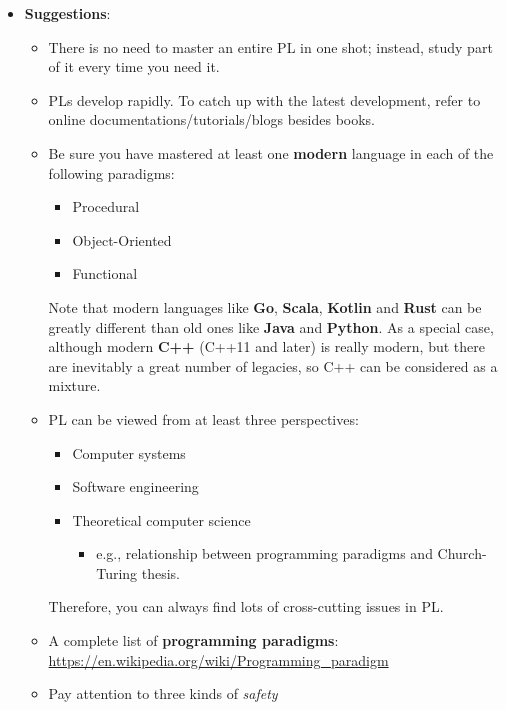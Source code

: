 \documentclass{article}
\begin{document}
\begin{itemize}
    \item \textbf{Suggestions}:
        \begin{itemize}
            \item There is no need to master an entire PL in one shot; instead, study part of it every time you need it.
            \item PLs develop rapidly. To catch up with the latest development, refer to online documentations/tutorials/blogs besides books.
            \item Be sure you have mastered at least one \textbf{modern} language in each of the following paradigms:
            \begin{itemize}
                \item Procedural
                \item Object-Oriented
                \item Functional
            \end{itemize}
            Note that modern languages like \textbf{Go}, \textbf{Scala}, \textbf{Kotlin} and \textbf{Rust} can be greatly different than old ones like \textbf{Java} and \textbf{Python}.
            As a special case, although modern \textbf{C++} (C++11 and later) is really modern, but there are inevitably a great number of legacies, so C++ can be considered as a mixture.
            \item PL can be viewed from at least three perspectives:
            \begin{itemize}
                \item Computer systems
                \item Software engineering
                \item Theoretical computer science
                \begin{itemize}
                    \item e.g., relationship between programming paradigms and Church-Turing thesis.
                \end{itemize}
            \end{itemize}
            Therefore, you can always find lots of cross-cutting issues in PL.
            \item A complete list of \textbf{programming paradigms}:\\
            \href{https://en.wikipedia.org/wiki/Programming\_paradigm}{https://en.wikipedia.org/wiki/Programming\_paradigm}
            \item Pay attention to three kinds of \emph{safety}

\end{itemize}
\end{itemize}
\end{document}
